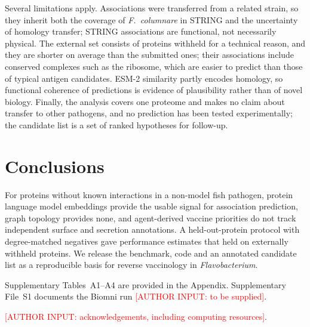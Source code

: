 \documentclass[pdflatex,sn-mathphys-num]{sn-jnl}
\newcommand{\authorinput}[1]{\textcolor{red}{[AUTHOR INPUT: #1]}}
\begin{document}
Several limitations apply. Associations were transferred from a related strain, so they inherit both the coverage of \textit{F.\ columnare} in STRING and the uncertainty of homology transfer; STRING associations are functional, not necessarily physical. The external set consists of proteins withheld for a technical reason, and they are shorter on average than the submitted ones; their associations include conserved complexes such as the ribosome, which are easier to predict than those of typical antigen candidates. ESM-2 similarity partly encodes homology, so functional coherence of predictions is evidence of plausibility rather than of novel biology. Finally, the analysis covers one proteome and makes no claim about transfer to other pathogens, and no prediction has been tested experimentally; the candidate list is a set of ranked hypotheses for follow-up.

\section{Conclusions}\label{sec:conclusions}

For proteins without known interactions in a non-model fish pathogen, protein language model embeddings provide the usable signal for association prediction, graph topology provides none, and agent-derived vaccine priorities do not track independent surface and secretion annotations. A held-out-protein protocol with degree-matched negatives gave performance estimates that held on externally withheld proteins. We release the benchmark, code and an annotated candidate list as a reproducible basis for reverse vaccinology in \textit{Flavobacterium}.

\backmatter

Supplementary Tables~A1--A4 are provided in the Appendix. Supplementary File~S1 documents the Biomni run \authorinput{to be supplied}.

\authorinput{acknowledgements, including computing resources}.
\end{document}
